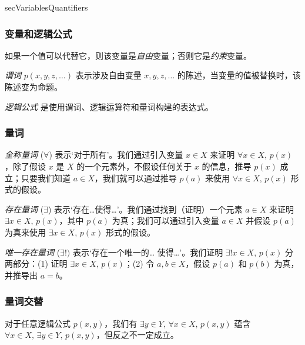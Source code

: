 \begin{tldr}{secVariablesQuantifiers}

\subsubsection*{变量和逻辑公式}

\begin{tldrlist}
如果一个值可以代替它，则该变量是\textit{自由}变量；否则它是\textit{约束}变量。

\textit{谓词} $p(x,y,z,\dots)$ 表示涉及自由变量 $x,y,z,\dots{}$ 的陈述，当变量的值被替换时，该陈述变为命题。

\textit{逻辑公式} 是使用谓词、逻辑运算符和量词构建的表达式。
\end{tldrlist}

\subsubsection*{量词}

\begin{tldrlist}
\textit{全称量词} ($\forall$) 表示`对于所有'。我们通过引入变量 $x \in X$ 来证明 $\forall x \in X,\, p(x)$ ，除了假设 $x$ 是 $X$ 的一个元素外，不假设任何关于 $x$ 的信息，推导 $p (x)$ 成立；只要我们知道 $a \in X$，我们就可以通过推导 $p(a)$ 来使用 $\forall x \in X,\, p(x)$ 形式的假设。

\textit{存在量词} ($\exists$) 表示`存在\dots{}使得\dots{}'。我们通过找到（证明）一个元素 $a \in X$ 来证明 $\exists x \in X,\, p(x)$，其中 $p(a)$ 为真；我们可以通过引入变量 $a \in X$ 并假设 $p(a)$ 为真来使用 $\exists x \in X,\, p(x)$ 形式的假设。

\textit{唯一存在量词} ($\exists !)$ 表示`存在一个唯一的\dots{} 使得\dots{}'。我们证明 $\exists ! x \in X,\, p(x)$ 分两部分：(1) 证明 $\exists x \in X,\, p(x)$；(2) 令 $a,b \in X$，假设 $p(a)$ 和 $p(b)$ 为真，并推导出 $a=b$。
\end{tldrlist}

\subsubsection*{量词交替}

\begin{tldrlist}
对于任意逻辑公式 $p(x,y)$，我们有 $\exists y \in Y,\, \forall x \in X,\, p(x,y)$ 蕴含 $\forall x \in X ,\, \exists y \in Y,\, p(x,y)$，但反之不一定成立。
\end{tldrlist}

\end{tldr}